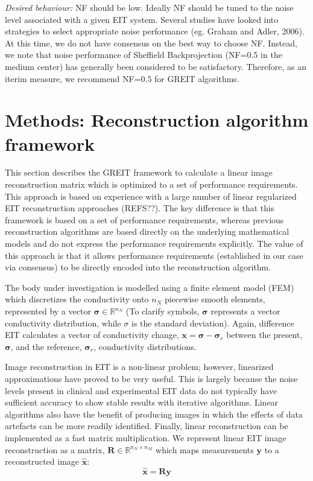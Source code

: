 \documentclass[12pt]{iopart}
\newcommand{\xB}{\mbox{$\mathbf{x}$}}
\newcommand{\xH}{\mbox{$\mathbf{\hat x}$}}
\newcommand{\yB}{\mbox{$\mathbf{y}$}}
\newcommand{\RB}{\mbox{$\mathbf{R}$}}
\newcommand{\sG}{\mbox{${\boldsymbol \sigma}$}}
\begin{document}
\begin{itemize}
\hspace{5mm}
{\em Desired behaviour:}
NF should be low. Ideally NF should be tuned to the noise
level associated with a given EIT system.
Several studies have looked into strategies to select
appropriate noise performance (eg. Graham and Adler, 2006).
At this time, we do not have consensus on the best
way to choose NF. Instead, we note that noise performance
of Sheffield Backprojection (NF=$0.5$ in the medium center)
has generally been considered to be satisfactory.
Therefore, as an iterim measure, we recommend NF=$0.5$
for GREIT algorithms.

\end{itemize}

\section{Methods: Reconstruction algorithm framework}

This section describes the GREIT framework to calculate
a linear image reconstruction matrix which is optimized
to a set of performance requirements. This approach
is based on experience with a large number of 
linear regularized EIT reconstruction approaches
(REFS??). The key difference is that this framework
is based on a set of performance requirements, whereas
previous reconstruction algorithms are based directly on
the underlying mathematical models and do not express
the performance requirements explicitly.
The value of this approach is that it allows
performance requirements (established in our case
via consensus) to be directly encoded into the
reconstruction algorithm.

The body under investigation is modelled using a finite element
model (FEM) which discretizes the conductivity onto $n_N$
piecewise smooth elements, represented by a vector
$\sG\in\mathbb{R}^{n_N}$ (To clarify symbols,
$\sG$ represents a vector conductivity distribution, while
$\sigma$ is the standard deviation).
Again, difference EIT calculates a vector of
conductivity change, $\xB = \sG - \sG_r$ between the present,
$\sG$, and the reference, $\sG_r$,
conductivity distributions.

Image reconstruction in EIT is a non-linear problem; however,
linearized approximations have proved to be very useful.
This is largely because the noise levels present in clinical
and experimental EIT data do not typically have sufficient
accuracy to show stable results with iterative algorithms.
Linear algorithms also have the benefit of producing
images in which the effects
of data artefacts can be more readily identified. Finally,
linear reconstruction can be implemented as a fast matrix
multiplication. We represent linear EIT image reconstruction
as a matrix, $\RB\in\mathbb{R}^{n_N\times n_M}$ which
maps measurements $\yB$ to a reconstructed image $\xH$:
\begin{equation} 
\label{reconst_eqn}
   \xH = \RB \yB
\end{equation} 
 
\end{document}
